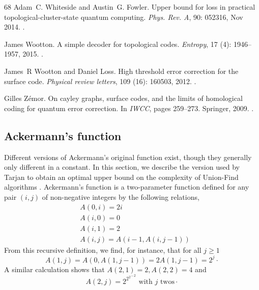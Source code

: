 \documentclass[a4paper, 10pt, accepted=2021-11-03]{quantumarticle}
\begin{document}
{\begin{thebibliography}{68}
Adam~C. Whiteside and Austin~G. Fowler.
\newblock Upper bound for loss in practical topological-cluster-state quantum
  computing.
\newblock \emph{Phys. Rev. A}, 90: 052316, Nov 2014.
\newblock {}.

James Wootton.
\newblock A simple decoder for topological codes.
\newblock \emph{Entropy}, 17 (4): 1946--1957, 2015.
\newblock {}.

James~R Wootton and Daniel Loss.
\newblock High threshold error correction for the surface code.
\newblock \emph{Physical review letters}, 109 (16): 160503,
  2012.
\newblock {}.

Gilles Z{\'e}mor.
\newblock On cayley graphs, surface codes, and the limits of homological coding
  for quantum error correction.
\newblock In \emph{IWCC}, pages 259--273. Springer, 2009.
\newblock {}.

\end{thebibliography}


\begin{appendix}

\section{Ackermann's function}

Different versions of Ackermann's original function exist, though they generally only different 
in a constant. 
In this section, we describe the version used by Tarjan to obtain an optimal 
upper bound on the complexity of Union-Find algorithms \cite{tarjan1975:union_find_complexity}.
Ackermann's function is a two-parameter function defined for any pair 
$(i, j)$ of non-negative integers by the following relations,
\begin{align*}
& A(0, i) = 2i\\
& A(i, 0) = 0\\
& A(i, 1) = 2\\
& A(i, j) = A(i-1, A(i, j-1))
\end{align*}
From this recursive definition, we find, for instance, that for all $j \geq 1$
$$
A(1, j) = A(0, A(1, j-1)) = 2A(1,j-1) = 2^j \cdot
$$
A similar calculation shows that $A(2,1) = 2, A(2,2) = 4$ and
$$
A(2, j) = 2^{{{2^{2}}^{-}}^{2}} \text{ with } j \text{ twos} \cdot
$$


\end{appendix}}
\end{document}
